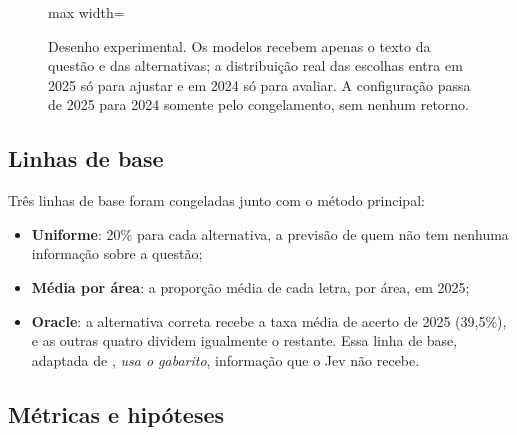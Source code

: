 \begin{figure}[ht]
\centering
\begin{adjustbox}{max width=\linewidth}

\end{adjustbox}
\caption{Desenho experimental. Os modelos recebem apenas o texto da questão e das alternativas; a distribuição real das escolhas entra em 2025 só para ajustar e em 2024 só para avaliar. A configuração passa de 2025 para 2024 somente pelo congelamento, sem nenhum retorno.}\label{fig:desenho}
\end{figure}

\subsection{Linhas de base}\label{sec:linhasbase}

Três linhas de base foram congeladas junto com o método principal:
\begin{itemize}[nosep]
  \item \textbf{Uniforme}: 20\% para cada alternativa, a previsão de quem não tem nenhuma informação sobre a questão;
  \item \textbf{Média por área}: a proporção média de cada letra, por área, em 2025;
  \item \textbf{Oracle}: a alternativa correta recebe a taxa média de acerto de 2025 (39,5\%), e as outras quatro dividem igualmente o restante. Essa linha de base, adaptada de \citet{saeuberli2025}, \emph{usa o gabarito}, informação que o Jev não recebe.
\end{itemize}

\subsection{Métricas e hipóteses}\label{sec:metricas}

